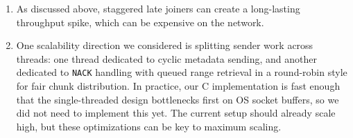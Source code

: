 \documentclass{article}
\begin{document}
\begin{enumerate}
\item As discussed above, staggered late joiners can create a long-lasting throughput spike, which can be expensive on the network.

\item One scalability direction we considered is splitting sender work across threads: one thread dedicated to cyclic metadata sending, and another dedicated to \texttt{NACK} handling with queued range retrieval in a round-robin style for fair chunk distribution. In practice, our C implementation is fast enough that the single-threaded design bottlenecks first on OS socket buffers, so we did not need to implement this yet. The current setup should already scale high, but these optimizations can be key to maximum scaling.
\end{enumerate}
\end{document}
